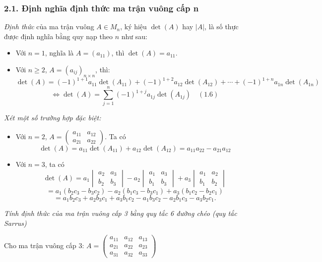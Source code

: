 \subsubsection*{2.1. Định nghĩa định thức ma trận vuông cấp n}
\textit{Định thức} của ma trận vuông \( A \in M_n \), ký hiệu \(\det(A)\) hay \(|A|\), là số thực được định nghĩa bằng quy nạp theo \( n \) như sau:
\begin{itemize}
    \item Với \( n = 1 \), nghĩa là \( A = (a_{11}) \), thì \(\det(A) = a_{11}\).
    \item Với \( n \ge 2 \), \( A = (a_{ij})_{n \times n} \), thì:
    \[
    \det(A) = (-1)^{1+1}a_{11}\det(A_{11}) + (-1)^{1+2}a_{12}\det(A_{12}) + \cdots + (-1)^{1+n}a_{1n}\det(A_{1n})
    \]
    \[
    \Leftrightarrow \det(A) = \sum_{j=1}^n (-1)^{1+j} a_{1j} \det(A_{1j}) \quad (1.6)
    \]
\end{itemize}

\textit{Xét một số trường hợp đặc biệt:}
\begin{itemize}
    \item Với \( n = 2 \), \( A = \begin{pmatrix}
    a_{11} & a_{12} \\
    a_{21} & a_{22}
    \end{pmatrix} \). Ta có
    \[
    \det(A) = a_{11}\det(A_{11}) + a_{12}\det(A_{12}) = a_{11}a_{22} - a_{21}a_{12}
    \]

    \item Với \( n = 3 \), ta có
    \[
    \det(A) = a_1 \begin{vmatrix}
    a_2 & a_3 \\
    b_2 & b_3
    \end{vmatrix} - a_2 \begin{vmatrix}
    a_1 & a_3 \\
    b_1 & b_3
    \end{vmatrix} + a_3 \begin{vmatrix}
    a_1 & a_2 \\
    b_1 & b_2
    \end{vmatrix}
    \]
    \[
    = a_1(b_2c_3 - b_3c_2) - a_2(b_1c_3 - b_3c_1) + a_3(b_1c_2 - b_2c_1)
    \]
    \[
    = a_1b_2c_3 + a_2b_3c_1 + a_3b_1c_2 - a_1b_3c_2 - a_2b_1c_3 - a_3b_2c_1.
    \]
\end{itemize}

\textit{Tính định thức của ma trận vuông cấp 3 bằng quy tắc 6 đường chéo (quy tắc Sarrus)}

Cho ma trận vuông cấp 3: \( A = \begin{pmatrix}
a_{11} & a_{12} & a_{13} \\
a_{21} & a_{22} & a_{23} \\
a_{31} & a_{32} & a_{33}
\end{pmatrix} \)

